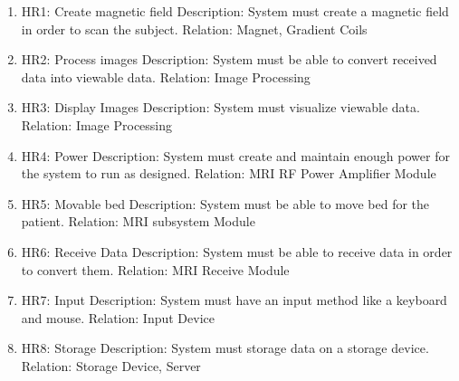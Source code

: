 \documentclass[conference]{IEEEtran}
\begin{document}
    \begin{enumerate}
        \item   HR1: Create magnetic field\newline
                Description:	System must create a magnetic field in order to scan the subject.\newline
                Relation:	Magnet, Gradient Coils
        \item   HR2: Process images\newline
                Description:    System must be able to convert received data into viewable data.\newline
                Relation:	Image Processing
    
        \item   HR3: Display Images\newline
                Description:	System must visualize viewable data.\newline
                Relation:	Image Processing
    
        \item   HR4: Power\newline
                Description:	System must create and maintain enough power for the system to run as designed.\newline
                    Relation:	MRI RF Power Amplifier Module
    
        \item   HR5: Movable bed\newline
                Description:	System must be able to move bed for the patient.\newline
                Relation:	MRI subsystem Module
    
        \item   HR6: Receive Data\newline
                Description:	System must be able to receive data in order to convert them.\newline
                Relation:	MRI Receive Module
    
        \item   HR7: Input\newline
                Description:	System must have an input method like a keyboard and mouse.\newline
                Relation: 	Input Device
    
        \item   HR8: Storage\newline
                Description:	System must storage data on a storage device.\newline
                Relation:	Storage Device, Server
    \end{enumerate}
    
\end{document}

